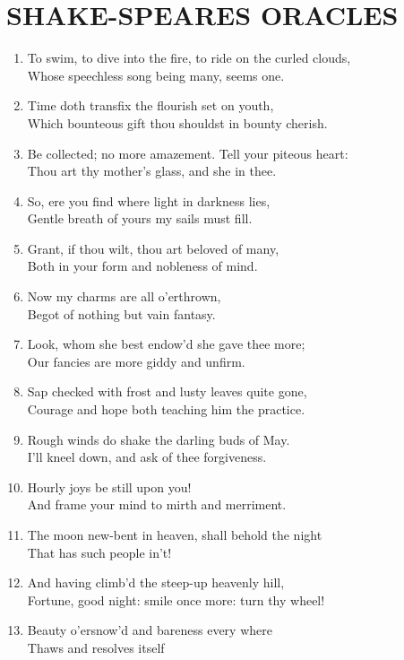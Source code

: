 \documentclass[17pt]{extarticle}
\date{}
\begin{document}
\section{SHAKE-SPEARES ORACLES}\label{shake-speares-oracles}

\begin{enumerate}
\item
  To swim, to dive into the fire, to ride on the curled clouds,\\Whose
  speechless song being many, seems one.
\item
  Time doth transfix the flourish set on youth,\\Which bounteous gift
  thou shouldst in bounty cherish.
\item
  Be collected; no more amazement. Tell your piteous heart:\\Thou art
  thy mother's glass, and she in thee.
\item
  So, ere you find where light in darkness lies,\\Gentle breath of yours
  my sails must fill.
\item
  Grant, if thou wilt, thou art beloved of many,\\Both in your form and
  nobleness of mind.
\item
  Now my charms are all o'erthrown,\\Begot of nothing but vain fantasy.
\item
  Look, whom she best endow'd she gave thee more;\\Our fancies are more
  giddy and unfirm.
\item
  Sap checked with frost and lusty leaves quite gone,\\Courage and hope
  both teaching him the practice.
\item
  Rough winds do shake the darling buds of May.\\I'll kneel down, and
  ask of thee forgiveness.
\item
  Hourly joys be still upon you!\\And frame your mind to mirth and
  merriment.
\item
  The moon new-bent in heaven, shall behold the night\\That has such
  people in't!
\item
  And having climb'd the steep-up heavenly hill,\\Fortune, good night:
  smile once more: turn thy wheel!
\item
  Beauty o'ersnow'd and bareness every where\\Thaws and resolves itself

\end{enumerate}
\end{document}
